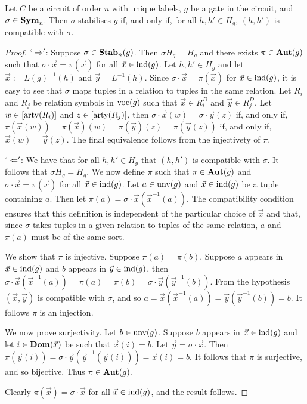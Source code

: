 \documentclass[../paper.tex]{subfiles}
\begin{document}
\begin{lem}
  Let $C$ be a circuit of order $n$ with unique labels, $g$ be a gate in the
  circuit, and $\sigma \in \text{\textbf{Sym}}_n$. Then $\sigma$ stabilises $g$ if, and only
  if, for all $h, h' \in H_g$, $(h, h')$ is compatible with $\sigma$.
  \label{lem:isostab-compatible}
\end{lem}

\begin{proof}
  $`\Rightarrow'$: Suppose $\sigma \in \text{\textbf{Stab}}_n(g)$. Then $\sigma H_g = H_g$ and
  there exists $\pi \in \text{\textbf{Aut}}(g)$ such that $\sigma \cdot \vec{x} = \pi
  (\vec{x})$ for all $\vec{x} \in \text{\upshape ind}(g)$. Let $h, h' \in H_g$ and let $\vec{x}
  := L(g)^{-1}(h)$ and $\vec{y} = L^{-1}(h)$. Since $\sigma \cdot \vec{x} = \pi
  (\vec{x})$ for $\vec{x} \in \text{\upshape ind}(g)$, it is easy to see that $\sigma$ maps
  tuples in a relation to tuples in the same relation. Let $R_i$ and $R_j$ be
  relation symbols in $\text{voc}(g)$ such that $\vec{x} \in R^D_i$ and $\vec{y} \in
  R^D_j$. Let $w \in [\mathrm{arty} (R_i)]$ and $z \in [\mathrm{arty} (R_j)]$, then $\sigma
  \cdot \vec{x} (w) = \sigma \cdot \vec{y}(z)$ if, and only if, $\pi(\vec{x}(w))
  = \pi (\vec{x})(w) = \pi (\vec{y})(z) = \pi(\vec{y}(z))$ if, and only if,
  $\vec{x}(w) = \vec{y}(z)$. The final equivalence follows from the injectivety
  of $\pi$.
  
  $`\Leftarrow'$: We have that for all $h, h' \in H_g$ that $(h, h')$ is
  compatible with $\sigma$. It follows that $\sigma H_g = H_g$. We now define
  $\pi$ such that $\pi \in \text{\textbf{Aut}}(g)$ and $\sigma \cdot \vec{x} = \pi (\vec{x})$
  for all $\vec{x} \in \text{\upshape ind}(g)$. Let $a \in \text{unv}(g)$ and $\vec{x} \in
  \text{\upshape ind}(g)$ be a tuple containing $a$. Then let $\pi (a) = \sigma \cdot \vec{x}
  (\vec{x}^{-1}(a))$. The compatibility condition ensures that this definition
  is independent of the particular choice of $\vec{x}$ and that, since $\sigma$
  takes tuples in a given relation to tuples of the same relation, $a$ and $\pi
  (a)$ must be of the same sort.
  
  We show that $\pi$ is injective. Suppose $\pi(a) = \pi(b)$. Suppose $a$
  appears in $\vec{x} \in \text{\upshape ind}(g)$ and $b$ appears in $\vec{y} \in \text{\upshape ind}(g)$,
  then $\sigma \cdot \vec{x} (\vec{x}^{-1}(a)) = \pi (a) = \pi(b) = \sigma \cdot
  \vec{y}(\vec{y}^{-1}(b))$. From the hypothesis $(\vec{x}, \vec{y})$ is
  compatible with $\sigma$, and so $a = \vec{x}(\vec{x}^{-1}(a)) =
  \vec{y}(\vec{y}^{-1}(b)) = b$. It follows $\pi$ is an injection.
  
  We now prove surjectivity. Let $b \in \text{unv}(g)$. Suppose $b$ appears in
  $\vec{x} \in \text{\upshape ind}(g)$ and let $i \in \text{\textbf{Dom}}(\vec{x})$ be such that $\vec{x}(i) =
  b$. Let $\vec{y} = \sigma \cdot \vec{x}$. Then $\pi (\vec{y}(i)) = \sigma
  \cdot \vec{y} (\vec{y}^{-1}(\vec{y}(i))) = \vec{x}(i) = b$. It follows that
  $\pi$ is surjective, and so bijective. Thus $\pi \in \text{\textbf{Aut}}(g)$.

  Clearly $\pi (\vec{x}) = \sigma \cdot \vec{x}$ for all $\vec{x} \in \text{\upshape ind}(g)$,
  and the result follows.
\end{proof}
\end{document}
